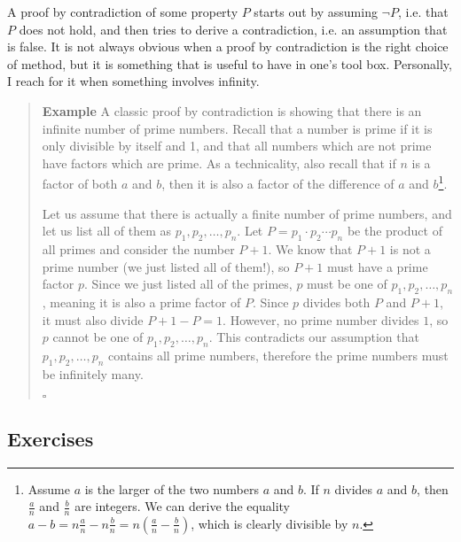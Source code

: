 \documentclass{tufte-handout}
\newcounter{example}
\newenvironment{example}
{\refstepcounter{example}\begin{quote}
\textbf{Example \arabic{example}}}
{

$\square$\end{quote}}
\begin{document}
A proof by contradiction of some property $P$ starts out by
assuming $\lnot P$, i.e. that $P$ does not hold, and then tries to
derive a contradiction, i.e. an assumption that is false. It is
not always obvious when a proof by contradiction is the right
choice of method, but it is something that is useful to have in
one's tool box. Personally, I reach for it when something involves
infinity.

\begin{example}
  A classic proof by contradiction is showing that there is an
  infinite number of prime numbers. Recall that a number is prime
  if it is only divisible by itself and 1, and that all numbers
  which are not prime have factors which are prime. As a
  technicality, also recall that if $n$ is a factor of both $a$
  and $b$, then it is also a factor of the difference of $a$ and
  $b$\footnote{Assume $a$ is the larger of the two numbers $a$ and
    $b$. If $n$ divides $a$ and $b$, then $\frac{a}{n}$ and
    $\frac{b}{n}$ are integers. We can derive the equality
    $a - b = n\frac{a}{n} - n\frac{b}{n} = n(\frac{a}{n} -
    \frac{b}{n})$, which is clearly divisible by $n$.}.

  Let us assume that there is actually a finite number of prime
  numbers, and let us list all of them as $p_1, p_2, \dots,p_n$.
  Let $P = p_1\cdot p_2\cdots p_n$ be the product of all primes
  and consider the number $P + 1$. We know that $P + 1$ is not a
  prime number (we just listed all of them!), so $P + 1$ must have
  a prime factor $p$. Since we just listed all of the primes, $p$
  must be one of $p_1, p_2, \dots,p_n$, meaning it is also a prime
  factor of $P$. Since $p$ divides both $P$ and $P + 1$, it must
  also divide $P + 1 - P = 1$. However, no prime number divides
  $1$, so $p$ cannot be one of $p_1, p_2, \dots,p_n$. This
  contradicts our assumption that $p_1, p_2, \dots,p_n$ contains
  all prime numbers, therefore the prime numbers must be
  infinitely many.
\end{example}

\subsection{Exercises}
\end{document}
